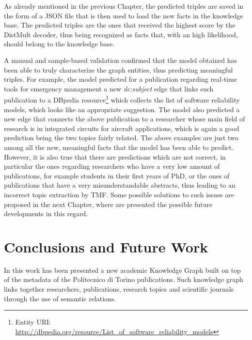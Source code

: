 \documentclass[%
    corpo=13.5pt,
    twoside,
    oldstyle,
    tipotesi=magistrale,
    greek,
    evenboxes
]{toptesi}
\begin{document}

As already mentioned in the previous Chapter, the predicted triples are saved in the
form of a JSON file that is then used to load the new facts in the knowledge
base.
The predicted triples are the ones that received the highest score by the
DistMult decoder, thus being recognized as facts that, with an high likelihood,
should belong to the knowledge base.

A manual and sample-based validation confirmed that the model obtained has been
able to truly characterize the graph entities, thus predicting meaningful
triples.
For example, the model predicted for a publication regarding
real-time tools for emergency management a new \emph{dc:subject} edge that
links such publication to a DBpedia resource\footnote{Entity URI: \url{http://dbpedia.org/resource/List_of_software_reliability_models}}
which collects the list of
software reliability models, which looks like an appropriate suggestion.
The model also predicted a new edge that connects the above publication to a
researcher whose main field of research is in integrated circuits for aircraft
applications, which is again a good prediction being the two topics fairly
related.
The above examples are just two among all the new, meaningful facts that
the model has been able to predict.
However, it is also true that there are predictions which are not correct, in
particular the ones regarding researchers who have a very low amount of
publications, for example students in their first years of PhD, or the ones
of publications that have a very misunderstandable abstracts, thus leading to
an incorrect topic extraction by TMF.
Some possible solutions to such issues are proposed in the next Chapter, where
are presented the possible future developments in this regard.



\chapter{Conclusions and Future Work}

In this work has been presented a new academic Knowledge Graph built on top of the
metadata of the Politecnico di Torino publications.
Such knowledge graph links together researchers, publications, research
topics and scientific journals through the use of semantic relations.
\end{document}
